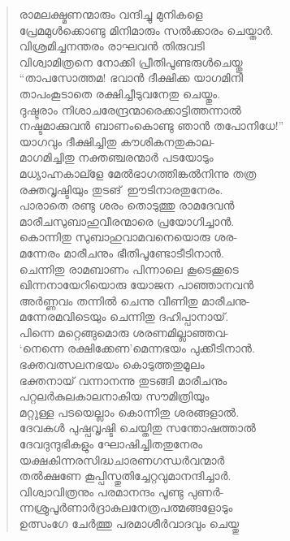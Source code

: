 \begin{verse}
രാമലക്ഷ്മണന്മാരും വന്ദിച്ചു മുനികളെ\\
പ്രേമമുള്‍ക്കൊണ്ടു മിനിമാരും സല്‍ക്കാരം ചെയ്താര്‍.\\
വിശ്രമിച്ചനന്തരം രാഘവന്‍ തിരുവടി\\
വിശ്വാമിത്രനെ നോക്കി പ്രീതിപൂണ്ടരുള്‍ചെയ്തു\\
“താപസോത്തമ! ഭവാന്‍ ദീക്ഷിക്ക യാഗമിനി\\
താപംകൂടാതെ രക്ഷിച്ചീടുവനേതു ചെയ്തും.\\
ദുഷ്ടരാം നിശാചരേന്ദ്രന്മാരെക്കാട്ടിത്തന്നാല്‍\\
നഷ്ടമാക്കുവന്‍ ബാണംകൊണ്ടു ഞാന്‍ തപോനിധേ!”\\
യാഗവും ദീക്ഷിച്ചിതു കൗശികനതുകാല-\\
മാഗമിച്ചിതു നക്തഞ്ചരന്മാര്‍ പടയോടും\\
മധ്യാഹ്നകാല്ളേ മേല്‍ഭാഗത്തിങ്കല്‍നിന്നു തത്ര\\
രക്തവൃഷ്ടിയും തുടങ്~ഈടിനാരതുനേരം.\\
പാരാതെ രണ്ടു ശരം തൊടുത്തു രാമദേവന്‍\\
മാരീചസുബാഹുവീരന്മാരെ പ്രയോഗിച്ചാന്‍.\\
കൊന്നിതു സുബാഹുവാമവനെയൊരു ശര-\\
മന്നേരം മാരീചനും ഭീതിപൂണ്ടോടീടിനാന്‍.\\
ചെന്നിതു രാമബാണം പിന്നാലെ കൂടെക്കൂടെ\\
ഖിന്നനായേറിയൊരു യോജന പാഞ്ഞാനവന്‍\\
അര്‍ണ്ണവം തന്നില്‍ ചെന്നു വീണിതു മാരീചനു-\\
മന്നേരമവിടെയും ചെന്നിതു ദഹിപ്പാനായ്.\\
പിന്നെ മറ്റെങ്ങുമൊരു ശരണമില്ലാഞ്ഞവ-\\
‘നെന്നെ രക്ഷിക്കേണ’മെന്നഭയം പുക്കീടിനാന്‍.\\
ഭക്തവത്സലനഭയം കൊടുത്തതുമൂലം\\
ഭക്തനായ് വന്നാനന്നു തുടങ്ങി മാരീചനും\\
പറ്റലര്‍കുലകാലനാകിയ സൗമിത്രിയും\\
മറ്റുള്ള പടയെല്ലാം കൊന്നിതു ശരങ്ങളാല്‍.\\
ദേവകള്‍ പുഷ്പവൃഷ്ടി ചെയ്തിതു സന്തോഷത്താല്‍\\
ദേവദുന്ദുഭികളും ഘോഷിച്ചിതതുനേരം\\
യക്ഷകിന്നരസിദ്ധചാരണഗന്ധര്‍വന്മാര്‍\\
തല്‍ക്ഷണേ കൂപ്പിസ്തുതിച്ചേറ്റവുമാനന്ദിച്ചാര്‍.\\
വിശ്വാവിത്രനും പരമാനന്ദം പൂണ്ടു പുണര്‍-\\
ന്നശ്രുപൂര്‍ണാര്‍ദ്രാകുലനേത്രപത്മങ്ങളോടും\\
ഉത്സംഗേ ചേര്‍ത്തു പരമാശീര്‍വാദവും ചെയ്തു\\

\end{verse}
